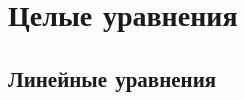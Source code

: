 \documentclass[10pt, a4paper]{article}
\begin{document}
\section{Целые уравнения}
	\subsection{Линейные уравнения}
\end{document}
